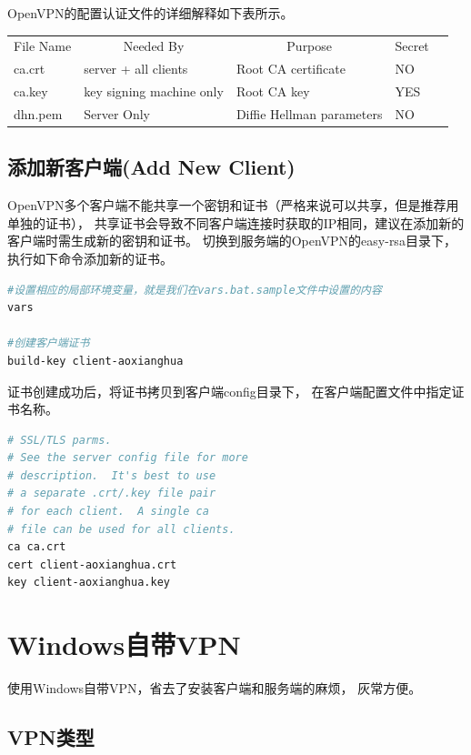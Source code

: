 \documentclass{book}
\begin{document}
OpenVPN的配置认证文件的详细解释如下表所示。

\begin{tabular}{|l|l|l|l|l|}
	\hline
	\multirow{1}{*}{File Name}
	& \multicolumn{1}{c|}{Needed By}
	& \multicolumn{1}{c|}{Purpose}
	& \multicolumn{1}{c|}{Secret}\\
	\cline{1-4}
	ca.crt & server + all clients & Root CA certificate & NO \\
	\hline
	ca.key & key signing machine only & Root CA key & YES\\
	\hline
	dh{n}.pem & Server Only & Diffie Hellman parameters & NO\\
	\hline						
\end{tabular}

\subsection{添加新客户端(Add New Client)}

OpenVPN多个客户端不能共享一个密钥和证书（严格来说可以共享，但是推荐用单独的证书），
共享证书会导致不同客户端连接时获取的IP相同，建议在添加新的客户端时需生成新的密钥和证书。
切换到服务端的OpenVPN的easy-rsa目录下，执行如下命令添加新的证书。

\begin{lstlisting}[language=Bash]
#设置相应的局部环境变量，就是我们在vars.bat.sample文件中设置的内容
vars

#创建客户端证书
build-key client-aoxianghua
\end{lstlisting}

证书创建成功后，将证书拷贝到客户端config目录下，
在客户端配置文件中指定证书名称。

\begin{lstlisting}[language=Bash]
# SSL/TLS parms.
# See the server config file for more
# description.  It's best to use
# a separate .crt/.key file pair
# for each client.  A single ca
# file can be used for all clients.
ca ca.crt
cert client-aoxianghua.crt
key client-aoxianghua.key
\end{lstlisting}

\section{Windows自带VPN}

使用Windows自带VPN，省去了安装客户端和服务端的麻烦，
灰常方便。

\subsection{VPN类型}
\end{document}
